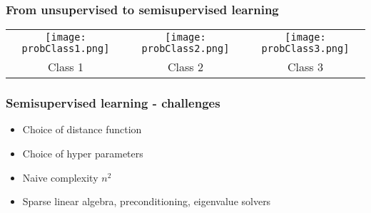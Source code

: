 \documentclass[12pt,fleqn]{beamer}
\begin{document}
\begin{frame}
\frametitle{From unsupervised to semisupervised learning }


\begin{center}
\begin{tabular}{ccc}
\texttt{[image: probClass1.png]} &
\texttt{[image: probClass2.png]} &
\texttt{[image: probClass3.png]} \\
Class 1 &  Class 2 & Class 3 
\end{tabular}
\end{center}


\end{frame}

\begin{frame}
\frametitle{Semisupervised learning - challenges}

\begin{itemize}
\item Choice of distance function
\item Choice of hyper parameters
\item Naive complexity $n^2$
\item Sparse linear algebra, preconditioning, eigenvalue solvers
\end{itemize}

\end{frame}
\end{document}
